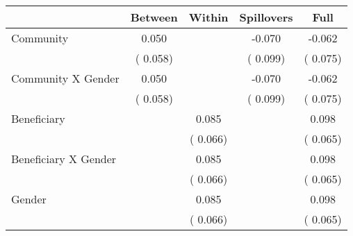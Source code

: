 
\begin{tabular}{l*{4}{c}}\hline&\multicolumn{1}{c}{Between}&\multicolumn{1}{c}{Within}&\multicolumn{1}{c}{Spillovers}&\multicolumn{1}{c}{Full}\\ \hline
 Community                                     &              0.050      &                                               &       -0.070 &        -0.062                            \\ 
                                                       &        (       0.058)           &                                       &       (       0.099)     &      (       0.075)                                           \\ 
 Community X Gender            &              0.050      &                                               &       -0.070 &        -0.062                            \\ 
                                                       &        (       0.058)           &                                       &       (       0.099)     &      (       0.075)                                           \\ 
 Beneficiary                           &                                               &        0.085    &                                &             0.098                            \\ 
                                                       &                                               & (       0.066)                  &                                        &      (       0.065)                                           \\ 
 Beneficiary X Gender          &                                               &        0.085    &                                &             0.098                            \\ 
                                                       &                                               & (       0.066)                  &                                        &      (       0.065)                                           \\ 
 Gender                                        &                              &        0.085    &                                &             0.098                            \\ 
                                                       &                                               & (       0.066)                  &                                        &      (       0.065)                                           \\ 

\end{tabular}
